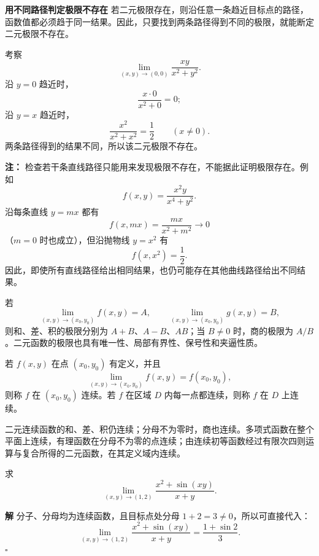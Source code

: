 \documentclass[fontset=fandol]{ctexart}
\newenvironment{custom}[1]{\par\noindent\textbf{#1}\quad}{\par\vspace{0.8em}}
\newenvironment{solution}{\par\noindent\textbf{解}\quad}{\hfill$\square$\par\vspace{0.8em}}
\newenvironment{warning}{\par\noindent\textbf{注：}\quad}{\par\vspace{0.8em}}
\begin{document}
\begin{custom}{用不同路径判定极限不存在}
	若二元极限存在，则沿任意一条趋近目标点的路径，函数值都必须趋于同一结果。因此，只要找到两条路径得到不同的极限，就能断定二元极限不存在。
\end{custom}

\begin{example}[两条路径给出不同结果]
	考察
	\[
	\lim_{(x,y)\to(0,0)}\frac{xy}{x^2+y^2}.
	\]
	沿 \(y=0\) 趋近时，
	\[
	\frac{x\cdot0}{x^2+0}=0;
	\]
	沿 \(y=x\) 趋近时，
	\[
	\frac{x^2}{x^2+x^2}=\frac12\qquad(x\neq0).
	\]
	两条路径得到的结果不同，所以该二元极限不存在。
\end{example}

\begin{warning}
	检查若干条直线路径只能用来发现极限不存在，不能据此证明极限存在。例如
	\[
	f(x,y)=\frac{x^2y}{x^4+y^2}.
	\]
	沿每条直线 \(y=mx\) 都有
	\[
	f(x,mx)=\frac{mx}{x^2+m^2}\to0
	\]
	（\(m=0\) 时也成立），但沿抛物线 \(y=x^2\) 有
	\[
	f(x,x^2)=\frac12.
	\]
	因此，即使所有直线路径给出相同结果，也仍可能存在其他曲线路径给出不同结果。
\end{warning}

\begin{theorem}[二元函数极限的基本运算法则]
	若
	\[
	\lim_{(x,y)\to(x_0,y_0)}f(x,y)=A,\qquad
	\lim_{(x,y)\to(x_0,y_0)}g(x,y)=B,
	\]
	则和、差、积的极限分别为 \(A+B\)、\(A-B\)、\(AB\)；当 \(B\neq0\) 时，商的极限为 \(A/B\)。二元函数的极限也具有唯一性、局部有界性、保号性和夹逼性质。
\end{theorem}

\begin{definition}[二元函数的连续性]
	若 \(f(x,y)\) 在点 \((x_0,y_0)\) 有定义，并且
	\[
	\lim_{(x,y)\to(x_0,y_0)}f(x,y)=f(x_0,y_0),
	\]
	则称 \(f\) 在 \((x_0,y_0)\) 连续。若 \(f\) 在区域 \(D\) 内每一点都连续，则称 \(f\) 在 \(D\) 上连续。
\end{definition}

\begin{proposition}[连续函数的运算]
	二元连续函数的和、差、积仍连续；分母不为零时，商也连续。多项式函数在整个平面上连续，有理函数在分母不为零的点连续；由连续初等函数经过有限次四则运算与复合所得的二元函数，在其定义域内连续。
\end{proposition}

\begin{example}[利用连续性求极限]
	求
	\[
	\lim_{(x,y)\to(1,2)}
	\frac{x^2+\sin(xy)}{x+y}.
	\]
\end{example}
\begin{solution}
	分子、分母均为连续函数，且目标点处分母 \(1+2=3\neq0\)，所以可直接代入：
	\[
	\lim_{(x,y)\to(1,2)}
	\frac{x^2+\sin(xy)}{x+y}
	=\frac{1+\sin2}{3}.
	\]
\end{solution}
\end{document}
